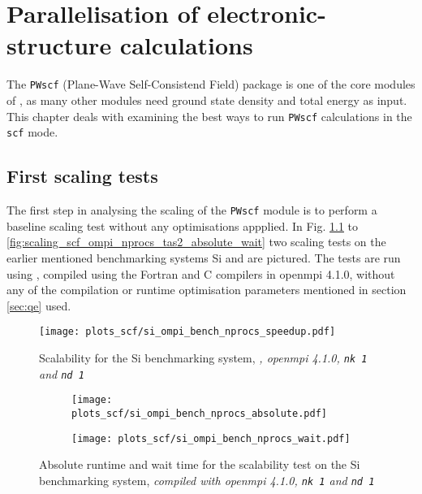 \documentclass[main.tex]{subfiles}
\begin{document}
\chapter{Parallelisation of electronic-structure calculations\label{ch:optimisation_scf}}

The \texttt{PWscf} (Plane-Wave Self-Consistend Field) package is one of the core modules of \QE, as many other modules need ground state density and total energy as input.
This chapter deals with examining the best ways to run \texttt{PWscf} calculations in the \texttt{scf} mode.

\section{First scaling tests}\label{sec:scf_first_scaling}

The first step in analysing the scaling of the \texttt{PWscf} module is to perform a baseline scaling test without any optimisations appplied. 
In Fig. \ref{fig:scaling_scf_ompi_nprocs_si_speedup} to \ref{fig:scaling_scf_ompi_nprocs_tas2_absolute_wait} two scaling tests on the earlier mentioned benchmarking systems Si and \TaS are pictured. 
The tests are run using , compiled using the Fortran and C compilers in \gls{openmpi} 4.1.0, without any of the compilation or runtime optimisation parameters mentioned in section \ref{sec:qe} used.

\begin{figure}[ht!]
\centering
\texttt{[image: plots\_scf/si\_ompi\_bench\_nprocs\_speedup.pdf]}
\caption{Scalability for the Si benchmarking system, \emph{, \gls{openmpi} 4.1.0, \texttt{nk 1} and \texttt{nd 1}}}
\label{fig:scaling_scf_ompi_nprocs_si_speedup}
\end{figure}

\begin{figure}[ht!]
\begin{subfigure}[b]{0.49\textwidth}
    \centering
    \texttt{[image: plots\_scf/si\_ompi\_bench\_nprocs\_absolute.pdf]}
\end{subfigure}
\begin{subfigure}[b]{0.49\textwidth}
    \centering
    \texttt{[image: plots\_scf/si\_ompi\_bench\_nprocs\_wait.pdf]}
\end{subfigure}
\caption{Absolute runtime and wait time for the scalability test on the Si benchmarking system, \emph{\QE compiled with \gls{openmpi} 4.1.0, \texttt{nk 1} and \texttt{nd 1}}}
\label{fig:scaling_scf_ompi_nprocs_si_absolute_wait}
\end{figure}
\end{document}
